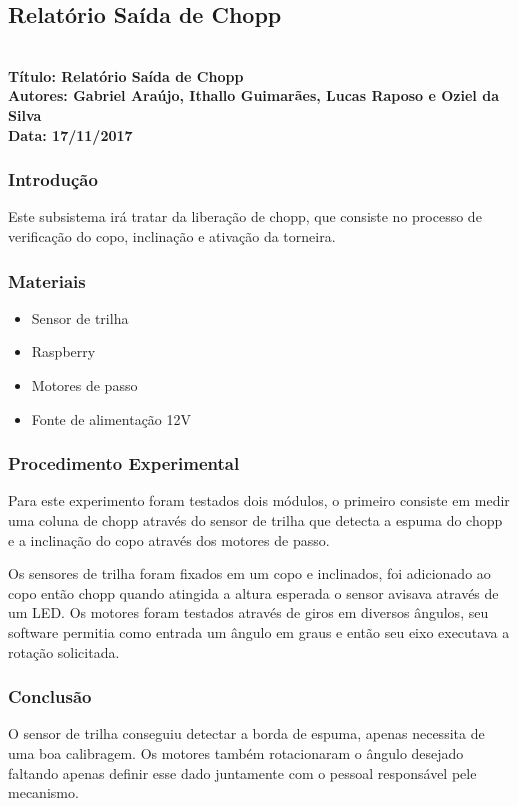 
\subsection{Relatório Saída de Chopp}    
 \textbf{ \\
  Título: Relatório Saída de Chopp \\
    Autores: Gabriel Araújo, Ithallo Guimarães, Lucas Raposo e Oziel da Silva \\
      Data: 17/11/2017} \\



\subsubsection{Introdução}
    Este subsistema irá tratar da liberação de chopp, que consiste no processo de verificação do copo, inclinação e ativação da torneira.

\subsubsection{Materiais}
\begin{itemize}
     \item Sensor de trilha
     \item Raspberry
     \item Motores de passo
     \item Fonte de alimentação 12V    
         
\end{itemize}

\subsubsection{Procedimento Experimental}

    Para este experimento foram testados dois módulos, o primeiro consiste em medir uma coluna de chopp através do sensor de trilha que detecta a espuma do chopp e a inclinação do copo através dos motores de passo.

    Os sensores de trilha foram fixados em um copo e inclinados, foi adicionado ao copo então chopp quando atingida a altura esperada o sensor avisava através de um LED.
    Os motores foram testados através de giros em diversos ângulos, seu software permitia como entrada um ângulo em graus e então seu eixo executava a rotação solicitada.

\subsubsection{Conclusão}

   O sensor de trilha conseguiu detectar a borda de espuma, apenas necessita de uma boa calibragem. Os motores também rotacionaram o ângulo desejado faltando apenas definir esse dado juntamente com o pessoal responsável pele mecanismo.
     

     
\noindent
